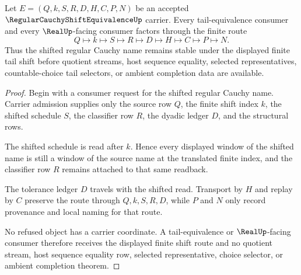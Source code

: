 \begin{theorem}
\label{thm:regular-cauchy-shift-equivalence-tail-stability}
Let $E=(Q,k,S,R,D,H,C,P,N)$ be an accepted $\RegularCauchyShiftEquivalenceUp$ carrier. Every tail-equivalence consumer and every $\RealUp$-facing consumer factors through the finite route
$$
Q \longmapsto k \longmapsto S \longmapsto R \longmapsto D \longmapsto H \longmapsto C \longmapsto P \longmapsto N.
$$
Thus the shifted regular Cauchy name remains stable under the displayed finite tail shift before quotient streams, host sequence equality, selected representatives, countable-choice tail selectors, or ambient completion data are available.
\end{theorem}
\begin{proof}
Begin with a consumer request for the shifted regular Cauchy name. Carrier admission supplies only the source row $Q$, the finite shift index $k$, the shifted schedule $S$, the classifier row $R$, the dyadic ledger $D$, and the structural rows.

The shifted schedule is read after $k$. Hence every displayed window of the shifted name is still a window of the source name at the translated finite index, and the classifier row $R$ remains attached to that same readback.

The tolerance ledger $D$ travels with the shifted read. Transport by $H$ and replay by $C$ preserve the route through $Q,k,S,R,D$, while $P$ and $N$ only record provenance and local naming for that route.

No refused object has a carrier coordinate. A tail-equivalence or $\RealUp$-facing consumer therefore receives the displayed finite shift route and no quotient stream, host sequence equality row, selected representative, choice selector, or ambient completion theorem.
\end{proof}


